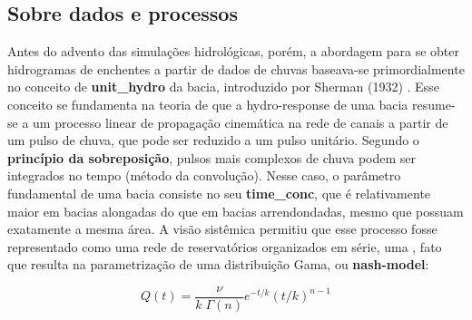 \documentclass[./main.tex]{subfiles}
\begin{document}
\subsection{Sobre dados e processos} \label{sec:hydro:databased}

\par Antes do advento das simulações hidrológicas, porém, a abordagem para se obter hidrogramas de enchentes a partir de dados de chuvas baseava-se primordialmente no conceito de \textbf{\gls{unit_hydro}} da bacia, introduzido por Sherman (1932) \cite{Sherman1932a}. Esse conceito se fundamenta na \gls{teoria} de que a \gls{hydro-response} de uma bacia resume-se a um processo linear de propagação cinemática na rede de canais a partir de um pulso de chuva, que pode ser reduzido a um pulso unitário. Segundo o \textbf{princípio da sobreposição}, pulsos mais complexos de chuva podem ser integrados no tempo (método da convolução). Nesse caso, o parâmetro fundamental de uma bacia consiste no seu \textbf{\gls{time_conc}}, que é relativamente maior em bacias alongadas do que em bacias arrendondadas, mesmo que possuam exatamente a mesma área. A visão sistêmica permitiu que esse processo fosse representado como uma rede de reservatórios organizados em série, uma , fato que resulta na parametrização de uma distribuição Gama, ou \textbf{\gls{nash-model}}:
\begin{linenomath*}
\begin{equation}
\label{eq:kalinin}
Q(t) = \frac{\nu}{k\; \Gamma(n)} e^{-t/k} (t/k )^{n-1}
\end{equation}
\end{linenomath*}
\end{document}

